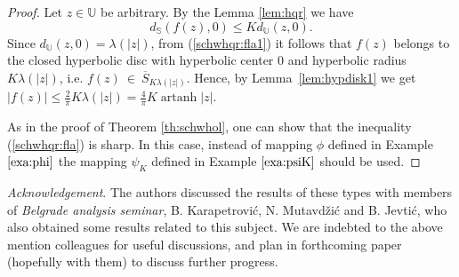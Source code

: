 \documentclass{amsart}
\newcommand{\artanh}{\mathop{\mathrm{artanh}}}
\begin{document}
\begin{proof}
Let $z\in\mathbb{U}$ be arbitrary. By the Lemma \ref{lem:hqr} we have
\begin{equation}\label{schwhqr:fla1}
    d_{\mathbb{S}}(f(z),0)\leqslant Kd_{\mathbb{U}}(z,0).
\end{equation}
Since $d_{\mathbb{U}}(z,0)=\lambda(|z|)$, from (\ref{schwhqr:fla1}) it follows that $f(z)$  belongs to the closed hyperbolic disc
with hyperbolic center $0$ and hyperbolic radius $K\lambda(|z|)$, i.e. $f(z)~\in~\overline{S}_{K\lambda(|z|)}$.
Hence, by Lemma~\ref{lem:hypdisk1} we get $\displaystyle |f(z)|\leqslant\frac{2}{\pi}K\lambda(|z|)=\frac{4}{\pi}K\artanh{|z|}$.

As in the proof of Theorem \ref{th:schwhol}, one can show that the inequality (\ref{schwhqr:fla}) is sharp. In this case, instead of mapping $\phi$ defined in Example $\ref{exa:phi}$ the mapping $\psi_K$ defined in Example $\ref{exa:psiK}$ should be used.


\end{proof}
{\it Acknowledgement}. The authors  discussed  the results of these types with members of \emph{Belgrade analysis seminar}, B. Karapetrovi\'c, N. Mutavd\v zi\'c and B. Jevti\'c, who also obtained
some results  related to this subject. We are indebted  to the above mention  colleagues
for useful   discussions, and plan in forthcoming paper (hopefully with them) to discuss  further progress.
\end{document}
